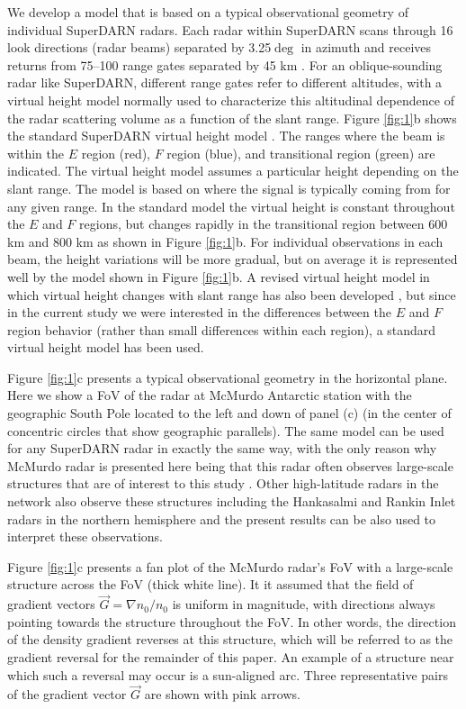 We develop a model that is based on a typical observational geometry of individual SuperDARN radars. Each radar within SuperDARN scans through 16 look directions (radar beams) separated by 3.25\(\deg\) in azimuth and receives returns from 75--100 range gates separated by 45 km \citep{Chisham2007}. For an oblique-sounding radar like SuperDARN, different range gates refer to different altitudes, with a virtual height model normally used to characterize this altitudinal dependence of the radar scattering volume as a function of the slant range. Figure \ref{fig:1}b shows the standard SuperDARN virtual height model \citep{Chisham2008}. The ranges where the beam is within the \(E\) region (red), \(F\) region (blue), and transitional region (green) are indicated. The virtual height model assumes a particular height depending on the slant range. The model is based on where the signal is typically coming from for any given range. In the standard model the virtual height is constant throughout the \(E\) and \(F\) regions, but changes rapidly in the transitional region between 600 km and 800 km as shown in Figure \ref{fig:1}b. For individual observations in each beam, the height variations will be more gradual, but on average it is represented well by the model shown in Figure \ref{fig:1}b. A revised virtual height model in which virtual height changes with slant range has also been developed \citep{Chisham2008}, but since in the current study we were interested in the differences between the \(E\) and \(F\) region behavior (rather than small differences within each region), a standard virtual height model has been used.


Figure \ref{fig:1}c presents a typical observational geometry in the horizontal plane. Here we show a FoV of the radar at McMurdo Antarctic station with the geographic South Pole located to the left and down of panel (c) (in the center of concentric circles that show geographic parallels). The same model can be used for any SuperDARN radar in exactly the same way, with the only reason why McMurdo radar is presented here being that this radar often observes large-scale structures that are of interest to this study \citep{Bristow2011,Lamarche2015}. Other high-latitude radars in the network also observe these structures including the Hankasalmi \citep{Milan2002a} and Rankin Inlet \citep{Koustov2012} radars in the northern hemisphere and the present results can be also used to interpret these observations.


Figure \ref{fig:1}c presents a fan plot of the McMurdo radar's FoV with a large-scale structure across the FoV (thick white line). It it assumed that the field of gradient vectors \(\vec{G}=\nabla n_0/n_0\) is uniform in magnitude, with directions always pointing towards the structure throughout the FoV. In other words, the direction of the density gradient reverses at this structure, which will be referred to as the gradient reversal for the remainder of this paper. An example of a structure near which such a reversal may occur is a sun-aligned arc. Three representative pairs of the gradient vector \(\vec{G}\) are shown with pink arrows.

